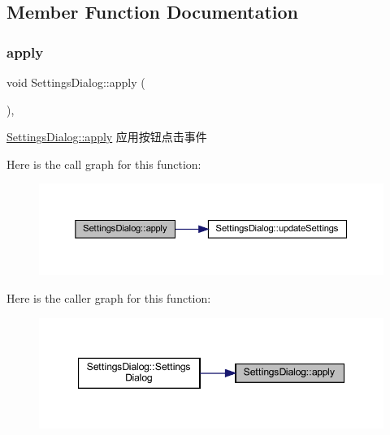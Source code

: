 \subsection{Member Function Documentation}
\mbox{\label{class_settings_dialog_aa0d7c1ec47555d438b86912af4830819}} 
\subsubsection{\texorpdfstring{apply}{apply}}
{\footnotesize\ttfamily void Settings\+Dialog\+::apply (\begin{DoxyParamCaption}{ }\end{DoxyParamCaption})\hspace{0.3cm}{\ttfamily [private]}, {\ttfamily [slot]}}



\mbox{\hyperlink{class_settings_dialog_aa0d7c1ec47555d438b86912af4830819}{Settings\+Dialog\+::apply}} 应用按钮点击事件 

Here is the call graph for this function\+:
\nopagebreak
\begin{figure}[H]
\begin{center}
\leavevmode
\includegraphics[width=350pt]{class_settings_dialog_aa0d7c1ec47555d438b86912af4830819_cgraph}
\end{center}
\end{figure}
Here is the caller graph for this function\+:
\nopagebreak
\begin{figure}[H]
\begin{center}
\leavevmode
\includegraphics[width=347pt]{class_settings_dialog_aa0d7c1ec47555d438b86912af4830819_icgraph}
\end{center}
\end{figure}
\mbox{\label{class_settings_dialog_a20ba98dff60a58a8dd732eb4d061ea3f}} 
